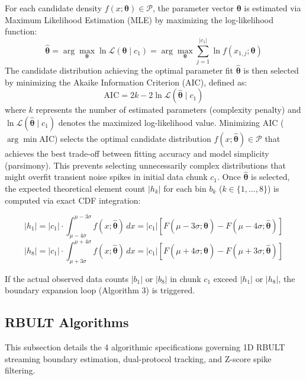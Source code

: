 \documentclass[a4paper,fleqn]{cas-sc}
\begin{document}
For each candidate density $f(x; \boldsymbol{\theta}) \in \mathcal{P}$, the parameter vector $\boldsymbol{\theta}$ is estimated via Maximum Likelihood Estimation (MLE) by maximizing the log-likelihood function:
\begin{equation}
\hat{\boldsymbol{\theta}} = \arg\max_{\boldsymbol{\theta}} \ln \mathcal{L}(\boldsymbol{\theta} \mid c_1) = \arg\max_{\boldsymbol{\theta}} \sum_{j=1}^{|c_1|} \ln f(x_{1,j}; \boldsymbol{\theta})
\end{equation}
The candidate distribution achieving the optimal parameter fit $\hat{\boldsymbol{\theta}}$ is then selected by minimizing the Akaike Information Criterion (AIC), defined as:
\begin{equation}
\text{AIC} = 2k - 2\ln \mathcal{L}(\hat{\boldsymbol{\theta}} \mid c_1)
\end{equation}
where $k$ represents the number of estimated parameters (complexity penalty) and $\ln \mathcal{L}(\hat{\boldsymbol{\theta}} \mid c_1)$ denotes the maximized log-likelihood value. Minimizing AIC ($\arg\min \text{AIC}$) selects the optimal candidate distribution $f(x; \hat{\boldsymbol{\theta}}) \in \mathcal{P}$ that achieves the best trade-off between fitting accuracy and model simplicity (parsimony). This prevents selecting unnecessarily complex distributions that might overfit transient noise spikes in initial data chunk $c_1$. Once $\hat{\boldsymbol{\theta}}$ is selected, the expected theoretical element count $|h_k|$ for each bin $b_k$ ($k \in \{1, \dots, 8\}$) is computed via exact CDF integration:

\begin{equation}
|h_1| = |c_1| \cdot \int_{\mu - 4\sigma}^{\mu - 3\sigma} f(x; \hat{\boldsymbol{\theta}}) \, dx = |c_1| \left[ F(\mu - 3\sigma; \hat{\boldsymbol{\theta}}) - F(\mu - 4\sigma; \hat{\boldsymbol{\theta}}) \right]
\end{equation}
\begin{equation}
|h_8| = |c_1| \cdot \int_{\mu + 3\sigma}^{\mu + 4\sigma} f(x; \hat{\boldsymbol{\theta}}) \, dx = |c_1| \left[ F(\mu + 4\sigma; \hat{\boldsymbol{\theta}}) - F(\mu + 3\sigma; \hat{\boldsymbol{\theta}}) \right]
\end{equation}

If the actual observed data counts $|b_1|$ or $|b_8|$ in chunk $c_1$ exceed $|h_1|$ or $|h_8|$, the boundary expansion loop (Algorithm 3) is triggered.

\subsection{RBULT Algorithms}
This subsection details the 4 algorithmic specifications governing 1D RBULT streaming boundary estimation, dual-protocol tracking, and Z-score spike filtering.
\end{document}

